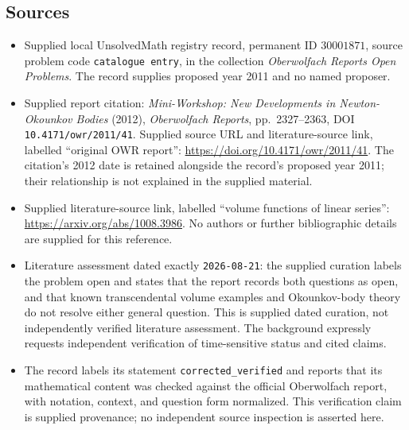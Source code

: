 \documentclass[11pt]{article}
\begin{document}
\subsection{Sources}
\begin{itemize}
\item Supplied local UnsolvedMath registry record, permanent ID \(30001871\), source problem code \texttt{catalogue entry}, in the collection \emph{Oberwolfach Reports Open Problems}. The record supplies proposed year 2011 and no named proposer.
\item Supplied report citation: \emph{Mini-Workshop: New Developments in Newton-Okounkov Bodies} (2012), \emph{Oberwolfach Reports}, pp.\ 2327--2363, DOI \texttt{10.4171/owr/2011/41}. Supplied source URL and literature-source link, labelled ``original OWR report'': \url{https://doi.org/10.4171/owr/2011/41}. The citation's 2012 date is retained alongside the record's proposed year 2011; their relationship is not explained in the supplied material.
\item Supplied literature-source link, labelled ``volume functions of linear series'': \url{https://arxiv.org/abs/1008.3986}. No authors or further bibliographic details are supplied for this reference.
\item Literature assessment dated exactly \texttt{2026-08-21}: the supplied curation labels the problem open and states that the report records both questions as open, and that known transcendental volume examples and Okounkov-body theory do not resolve either general question. This is supplied dated curation, not independently verified literature assessment. The background expressly requests independent verification of time-sensitive status and cited claims.
\item The record labels its statement \texttt{corrected\_verified} and reports that its mathematical content was checked against the official Oberwolfach report, with notation, context, and question form normalized. This verification claim is supplied provenance; no independent source inspection is asserted here.
\end{itemize}
\end{document}
